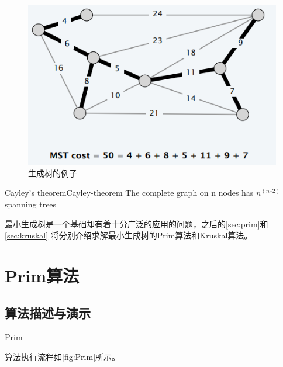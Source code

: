 \begin{figure}[hbt]
	\centering
	\includegraphics[scale=0.5]{image/exampleofMST.png}
	\caption{生成树的例子}\label{fig:exampleofMST}
\end{figure}

\begin{theorem}{Cayley’s theorem}{Cayley-theorem}
	The complete graph on n nodes has $n^(n–2)$ spanning trees
\end{theorem}

最小生成树是一个基础却有着十分广泛的应用的问题，之后的\autoref{sec:prim}和\autoref{sec:kruskal}
将分别介绍求解最小生成树的Prim算法和Kruskal算法。

\section{Prim算法}\label{sec:prim}
\subsection{算法描述与演示}
\begin{algorithm}
	\DontPrintSemicolon
	\caption{Prim}\label{alg:Prim}
\end{algorithm}

算法执行流程如\autoref{fig:Prim}所示。

